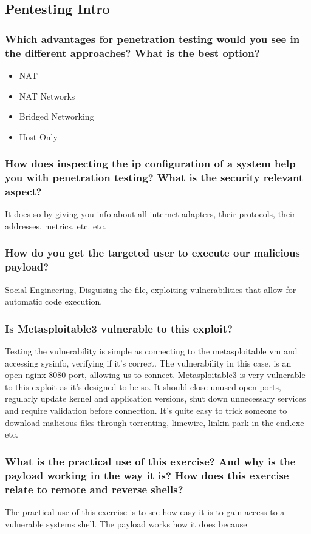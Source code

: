 \subsection*{Pentesting Intro}
\subsubsection*{Which advantages for penetration testing would you see in the different approaches? What is the best option?}

\begin{itemize}
    \item NAT
    \item NAT Networks
    \item Bridged Networking
    \item Host Only
\end{itemize}

\subsubsection*{How does inspecting the ip configuration of a system help you with penetration testing? What is the security relevant aspect?}
It does so by giving you info about all internet adapters, their protocols, their addresses, metrics, etc. etc.

\subsubsection*{How do you get the targeted user to execute our malicious payload?}
Social Engineering, Disguising the file, exploiting vulnerabilities that allow for automatic code execution.

\subsubsection*{Is Metasploitable3 vulnerable to this exploit?}
Testing the vulnerability is simple as connecting to the metasploitable vm and accessing sysinfo, verifying if it's correct.
The vulnerability in this case, is an open nginx 8080 port, allowing us to connect.
Metasploitable3 is very vulnerable to this exploit as it's designed to be so.
It should close unused open ports, regularly update kernel and application versions, shut down unnecessary services and require validation before connection.
It's quite easy to trick someone to download malicious files through torrenting, limewire, linkin-park-in-the-end.exe etc.

\subsubsection*{What is the practical use of this exercise? And why is the payload working in the way it is? How does this exercise relate to remote and reverse shells?}
The practical use of this exercise is to see how easy it is to gain access to a vulnerable systems shell. The payload works how it does because

